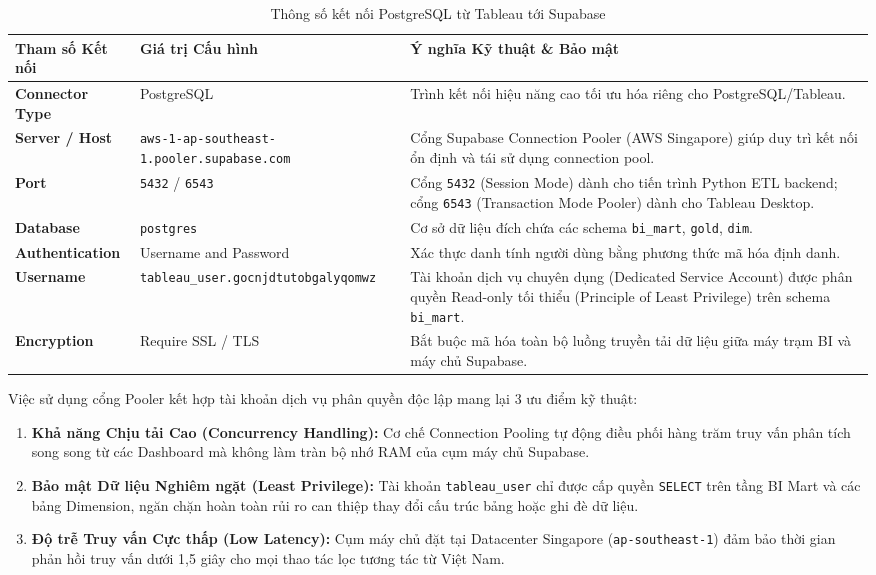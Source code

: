 \documentclass[12pt, a4paper]{report}
\begin{document}
\begin{table}[H]
\centering
\caption{Thông số kết nối PostgreSQL từ Tableau tới Supabase}
\label{tab:tableau_connection_params}
\small
\renewcommand{\arraystretch}{1.25}
\begin{tabularx}{\textwidth}{@{} l l X @{}}
\toprule
\textbf{Tham số Kết nối} & \textbf{Giá trị Cấu hình} & \textbf{Ý nghĩa Kỹ thuật \& Bảo mật} \\
\midrule
\textbf{Connector Type} & PostgreSQL & Trình kết nối hiệu năng cao tối ưu hóa riêng cho PostgreSQL/Tableau. \\
\textbf{Server / Host} & \texttt{aws-1-ap-southeast-1.\allowbreak pooler.supabase.com} & Cổng Supabase Connection Pooler (AWS Singapore) giúp duy trì kết nối ổn định và tái sử dụng connection pool. \\
\textbf{Port} & \texttt{5432} / \texttt{6543} & Cổng \texttt{5432} (Session Mode) dành cho tiến trình Python ETL backend; cổng \texttt{6543} (Transaction Mode Pooler) dành cho Tableau Desktop. \\
\textbf{Database} & \texttt{postgres} & Cơ sở dữ liệu đích chứa các schema \texttt{bi\_mart}, \texttt{gold}, \texttt{dim}. \\
\textbf{Authentication} & Username and Password & Xác thực danh tính người dùng bằng phương thức mã hóa định danh. \\
\textbf{Username} & \texttt{tableau\_user.gocnjdtutobgalyqomwz} & Tài khoản dịch vụ chuyên dụng (Dedicated Service Account) được phân quyền Read-only tối thiểu (Principle of Least Privilege) trên schema \texttt{bi\_mart}. \\
\textbf{Encryption} & Require SSL / TLS & Bắt buộc mã hóa toàn bộ luồng truyền tải dữ liệu giữa máy trạm BI và máy chủ Supabase. \\
\bottomrule
\end{tabularx}


\end{table}

Việc sử dụng cổng Pooler kết hợp tài khoản dịch vụ phân quyền độc lập mang lại 3 ưu điểm kỹ thuật:
\begin{enumerate}[label=\arabic*., leftmargin=*]
    \item \textbf{Khả năng Chịu tải Cao (Concurrency Handling):} Cơ chế Connection Pooling tự động điều phối hàng trăm truy vấn phân tích song song từ các Dashboard mà không làm tràn bộ nhớ RAM của cụm máy chủ Supabase.
    \item \textbf{Bảo mật Dữ liệu Nghiêm ngặt (Least Privilege):} Tài khoản \texttt{tableau\_user} chỉ được cấp quyền \texttt{SELECT} trên tầng BI Mart và các bảng Dimension, ngăn chặn hoàn toàn rủi ro can thiệp thay đổi cấu trúc bảng hoặc ghi đè dữ liệu.
    \item \textbf{Độ trễ Truy vấn Cực thấp (Low Latency):} Cụm máy chủ đặt tại Datacenter Singapore (\texttt{ap-southeast-1}) đảm bảo thời gian phản hồi truy vấn dưới 1,5 giây cho mọi thao tác lọc tương tác từ Việt Nam.
\end{enumerate}
\end{document}
